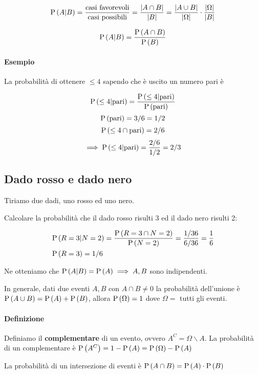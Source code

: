 \[ \text{P}\left(A|B\right) = \dfrac{\text{casi favorevoli}}{\text{casi possibili}} = \dfrac{\lvert A \cap B\rvert}{\lvert B\rvert} = \dfrac{\lvert A \cup B\rvert}{\lvert\Omega\rvert} \cdot \dfrac{\lvert\Omega\rvert}{\lvert B\rvert}\]

\[ \text{P}\left(A|B\right) = \dfrac{\text{P}\left(A \cap B\right)}{\text{P}\left(B\right)} \]

\paragraph{Esempio}
La probabilità di ottenere $ \leq 4 $ sapendo che è uscito un numero pari è

\[ \text{P}\left(\leq 4|\text{pari}\right) = \dfrac{\text{P}\left(\leq 4 | \text{pari}\right)}{\text{P}\left(\text{pari}\right)} \]
\[ \text{P}\left(\text{pari}\right) = 3/6 = 1/2 \]
\[ \text{P}\left(\leq 4 \cap \text{pari}\right) = 2/6 \]
\[ \implies \text{P}\left(\leq 4|\text{pari}\right) = \dfrac{2/6}{1/2} = 2/3 \]  
\subsection{Dado rosso e dado nero}

Tiriamo due dadi, uno rosso ed uno nero.

Calcolare la probabilità che il dado rosso risulti 3 ed il dado nero risulti 2:

\begin{align*}
	& \text{P}\left(R=3 | N=2\right) = \dfrac{\text{P}\left(R=3 \cap N=2\right)}{\text{P}\left(N=2\right)} = \dfrac{1/36}{6/36} = \dfrac{1}{6} \\
	& \text{P}\left(R=3\right) = 1/6
\end{align*}

Ne otteniamo che $ \text{P}\left(A|B\right) = \text{P}\left(A\right) \implies A, B $ sono indipendenti.

In generale, dati due eventi $ A, B $ con $ A \cap B \neq 0 $ la probabilità dell'unione è $ \text{P}\left(A \cup B\right) = \text{P}\left(A\right) + \text{P}\left(B\right) $, allora $ \text{P}\left(\Omega\right) = 1 $ dove $ \Omega = $ tutti gli eventi.

\paragraph{Definizione} Definiamo il \textbf{complementare} di un evento, ovvero $ A^C=\Omega \backslash A $. La probabilità di un complementare è $ \text{P}\left(A^C\right) = 1 - \text{P}\left(A\right) = \text{P}\left(\Omega\right) - \text{P}\left(A\right) $

La probabilità di un intersezione di eventi è $ \text{P}\left(A \cap B\right) = \text{P}\left(A\right) \cdot \text{P}\left(B\right) $

\clearpage
